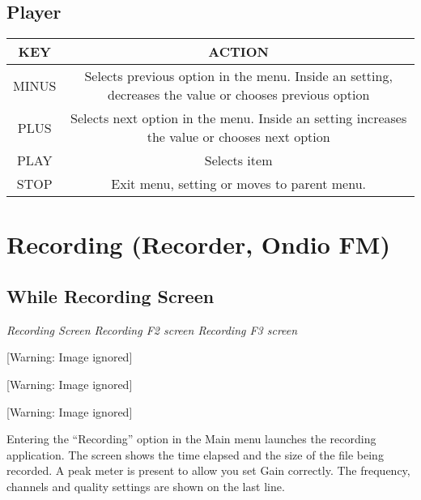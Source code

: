 \subsection{Player}

\begin{table}[h!]
  \begin{center}
    \begin{tabular}{|c|c|}
      \hline
      KEY & ACTION \\\hline
      MINUS & Selects previous option in the menu. Inside an setting, decreases the value or chooses previous option \\\hline
      PLUS & Selects next option in the menu. Inside an setting increases the value or chooses next option \\\hline
      PLAY & Selects item \\\hline
      STOP & Exit menu, setting or moves to parent menu. \\\hline
    \end{tabular}
  \end{center}
\end{table}

\section{\label{ref:Recording}Recording (Recorder, Ondio FM)}
\subsection{\label{ref:Whilerecordingscreen}While Recording Screen}
{\centering\itshape
Recording Screen  Recording F2 screen  Recording F3 screen
\par}

\begin{center}
 [Warning: Image ignored] %

\end{center}
\begin{center}
 [Warning: Image ignored] %

\end{center}
\begin{center}
 [Warning: Image ignored] %

\end{center}
Entering the ``Recording'' option in the Main menu launches the
recording application. The screen shows the time elapsed and the size
of the file being recorded. A peak meter is present to allow you set
Gain correctly.  The frequency, channels and quality settings are shown
on the last line.

